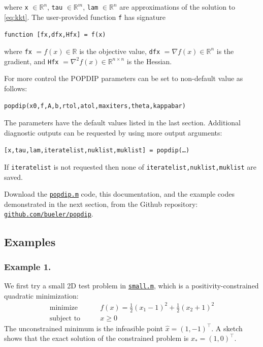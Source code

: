 \documentclass[11pt]{article}
\newcommand{\RR}{\mathbb{R}}
\newcommand{\grad}{\nabla}
\begin{document}
\medskip
\noindent where \texttt{x} $\in\RR^n$, \texttt{tau} $\in\RR^m$, \texttt{lam} $\in\RR^n$ are approximations of the solution to \eqref{eq:kkt}.  The user-provided function \texttt{f} has signature

\medskip
\centerline{\texttt{function [fx,dfx,Hfx] = f(x)}}

\medskip
\noindent where \texttt{fx} $=f(x) \in\RR$ is the objective value, \texttt{dfx} $=\grad f(x) \in\RR^n$ is the gradient, and \texttt{Hfx} $= \grad^2 f(x) \in\RR^{n\times n}$ is the Hessian.

For more control the POPDIP parameters can be set to non-default value as follows:

\medskip
\centerline{\texttt{popdip(x0,f,A,b,rtol,atol,maxiters,theta,kappabar)}}

\medskip
\noindent The parameters have the default values listed in the last section.  Additional diagnostic outputs can be requested by using more output arguments:

\medskip
\centerline{\texttt{[x,tau,lam,iteratelist,nuklist,muklist] = popdip(\dots)}}

\medskip
\noindent If \texttt{iteratelist} is not requested then none of \texttt{iteratelist,nuklist,muklist} are saved.

Download the \href{https://github.com/bueler/popdip/blob/main/matlab/popdip.m}{\texttt{popdip.m}} code, this documentation, and the example codes demonstrated in the next section, from the Github repository:\, \href{https://github.com/bueler/popdip}{\texttt{github.com/bueler/popdip}}.


\subsection*{Examples}

\subsubsection*{Example 1.}

We first try a small 2D test problem in \href{https://github.com/bueler/popdip/blob/main/matlab/small.m}{\texttt{small.m}}, which is a positivity-constrained quadratic minimization:
\begin{equation}
\begin{matrix}
\text{minimize} \qquad & f(x) = \frac{1}{2} (x_1-1)^2 + \frac{1}{2} (x_2+1)^2 \\
\text{subject to} \qquad & x \ge 0
\end{matrix} \label{eq:smallproblem}
\end{equation}
The unconstrained minimum is the infeasible point $\hat x =(1,-1)^\top$.  A sketch shows that the exact solution of the constrained problem is $x_*=(1,0)^\top$.
\end{document}
